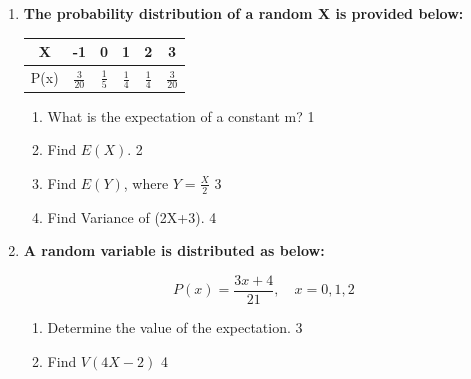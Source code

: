 \documentclass[a4paper,oneside]{book}
\begin{document}
\begin{enumerate}
	  \begin{center}
	  $\displaystyle f(x) = \frac{1}{30} (k+2x); 2 < x < 5$
	  \end{center}
  
  \begin{enumerate}
    \item
    What is a random variable? \hfill 1
    \item
		Is probability a discrete variable? Explain in brief. \hfill 2
    \item  
	Find the value of k.  \hfill 3
    \item
	Determine the expectation and variance. \hfill 4
  \end{enumerate}
  
   \item
	  \textbf{The probability distribution of a random X is provided below:} 
	  
	  \begin{table}[h]
	  \centering
\begin{tabular}{c|ccccc}
X & -1 & 0 & 1 & 2 & 3 \\ \hline
P(x) & $\frac 3{20}$ & $\frac 15$ & $\frac 14$ & $\frac 14$ & $\frac 3{20}$
\end{tabular}
\end{table}
  
  \begin{enumerate}
    \item
	What is the expectation of a constant m? \hfill 1
    \item
	Find $E(X).$ \hfill 2
    \item  
	Find $E(Y)$, where $Y = \frac X2$  \hfill 3
    \item
	Find Variance of (2X+3). \hfill 4
  \end{enumerate}
  
    
        \item \textbf{A random variable is distributed as below:}
        
        \begin{center}
  \textbf{\[
P(x) = \frac{3x + 4}{21}, \quad x = 0, 1, 2
\]
}
  \end{center}

  \begin{enumerate}
    \item
    	Determine the value of the expectation. \hfill 3
     \item
     	Find $V(4X-2)$ \hfill 4
  \end{enumerate}
  

\end{enumerate}
\end{document}
